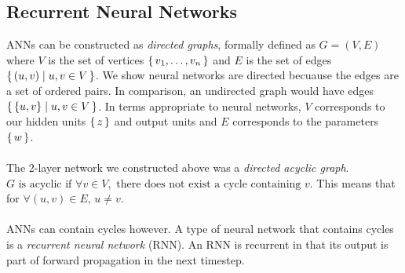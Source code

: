 \subsection{Recurrent Neural Networks}
ANNs can be constructed as \textit{directed graphs}, formally defined as $G = (V, E)$ where 
$V$ is the set of vertices $\set{v_1, \ldots, v_n}$ and $E$ is the set of edges 
$\set{(u,v) | u, v \in V}$. We show neural networks are directed becuause the edges are a 
set of ordered pairs. In comparison, an undirected graph would have edges 
$\set{ \{ u,v \} | u, v \in V}$.
In terms appropriate to neural networks, $V$ corresponds to our hidden units $\set{z}$ 
and output units and $E$ corresponds to the parameters $\set{w}$.
\\\\
The 2-layer network we constructed above was a \textit{directed acyclic graph}.
$G \text{ is acyclic if } \forall v \in V, \text{ there does not exist a cycle
containing } v$. This means that for $\forall (u,v) \in E \text{, } u \neq v$.
\\\\
ANNs can contain cycles however. A type of neural network that contains cycles is a 
\textit{recurrent neural network} (RNN). An RNN is recurrent in that its output is 
part of forward propagation in the next timestep. 


